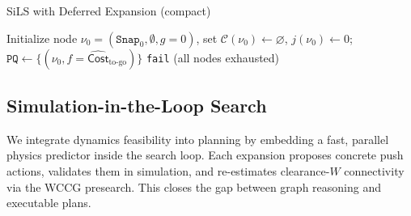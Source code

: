\begin{algorithm}[t]
\small
\caption{SiLS with Deferred Expansion (compact)}
\label{alg:SiLS}
\DontPrintSemicolon
{}
Initialize node $\nu_0=(\texttt{Snap}_0,\emptyset,g{=}0)$, set $\mathcal{C}(\nu_0)\leftarrow\varnothing$, $j(\nu_0)\leftarrow 0$;\\
$\texttt{PQ}\leftarrow\{(\nu_0,f{=}\widehat{\mathsf{Cost}}_{\text{to-go}})\}$\;
\Return \texttt{fail} \; (all nodes exhausted)
\end{algorithm}

\subsection{Simulation-in-the-Loop Search}
\label{subsec:simloop}

We integrate dynamics feasibility into planning by embedding a fast, parallel physics predictor inside the search loop. Each expansion proposes concrete push actions, validates them in simulation, and re-estimates clearance-$W$ connectivity via the WCCG presearch. This closes the gap between graph reasoning and executable plans.

